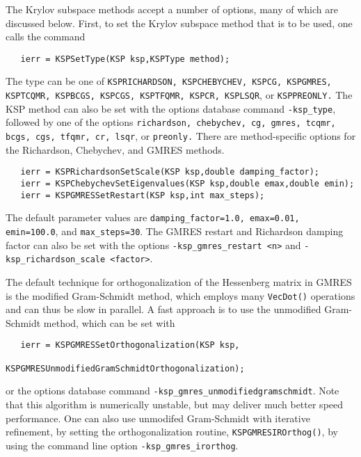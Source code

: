 The Krylov subspace methods accept a number of options, many of which 
are discussed below.  First, to set the Krylov subspace method that is to 
be used, one calls the command 
\begin{verbatim}
   ierr = KSPSetType(KSP ksp,KSPType method);
\end{verbatim}
The type can be one of {\tt KSPRICHARDSON, KSPCHEBYCHEV, KSPCG, KSPGMRES, 
KSPTCQMR, KSPBCGS, KSPCGS, KSPTFQMR, KSPCR, KSPLSQR}, or {\tt KSPPREONLY.}
  
   
 
The KSP method can also be set with the options database command 
{\tt -ksp\_type},
followed by one of the options {\tt richardson, chebychev, cg, gmres, tcqmr, 
bcgs, cgs, tfqmr, cr, lsqr}, or {\tt preonly.} 
There are method-specific options for the Richardson, Chebychev,
and GMRES  
methods.    
\begin{verbatim}
   ierr = KSPRichardsonSetScale(KSP ksp,double damping_factor);
   ierr = KSPChebychevSetEigenvalues(KSP ksp,double emax,double emin);
   ierr = KSPGMRESSetRestart(KSP ksp,int max_steps);
\end{verbatim}
The default parameter values are {\tt damping\_factor=1.0, 
emax=0.01, emin=100.0}, and {\tt max\_steps=30}. The GMRES 
 restart and Richardson damping factor
can also be set with the options {\tt -ksp\_gmres\_restart <n>}
and {\tt -ksp\_richardson\_scale <factor>}.  

The default technique for orthogonalization of the Hessenberg
matrix in GMRES is the modified Gram-Schmidt method, which
employs many {\tt VecDot()} operations and can thus be slow in parallel.
A fast approach is to use the 
unmodified Gram-Schmidt method, which can be set 
with  
\begin{verbatim}
   ierr = KSPGMRESSetOrthogonalization(KSP ksp,
                               KSPGMRESUnmodifiedGramSchmidtOrthogonalization);
\end{verbatim}
or the options database command {\tt -ksp\_gmres\_unmodifiedgramschmidt}.
Note that this algorithm is numerically unstable, but may deliver 
much better speed performance. One can also use 
unmodifed Gram-Schmidt with iterative refinement, 
 by setting the orthogonalization routine,
{\tt KSPGMRESIROrthog()}, by using the command line option 
{\tt -ksp\_gmres\_irorthog}. 

